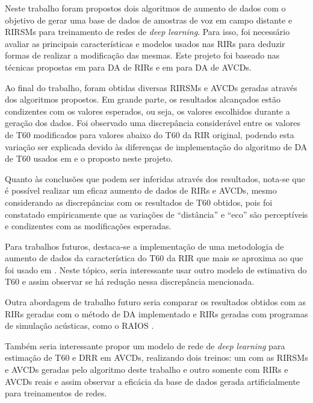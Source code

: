Neste trabalho foram propostos dois algoritmos de aumento de dados com o objetivo de gerar uma base de dados de amostras de voz 
em campo distante e RIRSMs para treinamento de redes de \textit{deep learning}.
Para isso, foi necessário avaliar as principais características e modelos usados nas RIRs para deduzir formas de realizar
a modificação das mesmas. Este projeto foi baseado nas técnicas propostas em \cite{RIR_Data_Aug} para DA de RIRs e em \cite{Speech_Rec}
para DA de AVCDs.

Ao final do trabalho, foram obtidas diversas RIRSMs e AVCDs geradas através dos algoritmos propostos. 
Em grande parte, os resultados alcançados estão condizentes com os valores esperados, ou seja, os valores
escolhidos durante a geração dos dados. Foi observado uma discrepância considerável entre os valores de T60 modificados 
para valores abaixo do T60 da RIR original, podendo esta variação ser explicada devido às diferenças de implementação 
do algoritmo de DA de T60 usados em \cite{RIR_Data_Aug} e o proposto neste projeto.

Quanto às conclusões que podem ser inferidas através dos resultados, nota-se que é possível realizar um eficaz
aumento de dados de RIRs e AVCDs, mesmo considerando as discrepâncias com os resultados de T60 obtidos,
pois foi constatado empiricamente que as variações de “distância” e “eco” são perceptíveis e condizentes com as modificações
esperadas.

Para trabalhos futuros, destaca-se a implementação de uma metodologia de aumento de dados da característica do T60
da RIR que mais se aproxima ao que foi usado em \cite{RIR_Data_Aug}. Neste tópico, seria interessante usar outro modelo
de estimativa do T60 e assim observar se há redução nessa discrepância mencionada.

Outra abordagem de trabalho futuro seria comparar os resultados obtidos com as RIRs geradas com o método de DA implementado e RIRs 
geradas com programas de simulação acústicas, como o RAIOS \cite{RAIOS}.

Também seria interessante propor um modelo de rede de \textit{deep learning} para estimação de T60 e DRR em AVCDs,
realizando dois treinos: um com as RIRSMs e AVCDs geradas pelo algoritmo deste trabalho e outro somente com RIRs e AVCDs reais e 
assim observar a eficácia da base de dados gerada artificialmente para treinamentos de redes.







